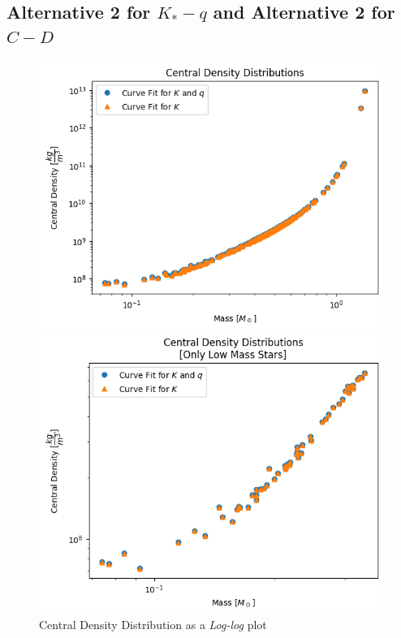\documentclass[letterpaper,12pt]{article}
\begin{document}
\subsection{Alternative 2 for $K_* - q$ and Alternative 2 for $C-D$}


\begin{figure}[H]
\begin{minipage}{.5\textwidth}
\centerline{\includegraphics[width=\linewidth]{figures/appendix/2_2_1_n_ll_rho_m.png}}
\end{minipage}
\begin{minipage}{.5\textwidth}
\centerline{\includegraphics[width=\linewidth]{figures/appendix/2_2_2_n_ll_rho_m_.png}}
\end{minipage}
\caption{Central Density Distribution as a \textit{Log-log} plot}
\end{figure}
\end{document}
